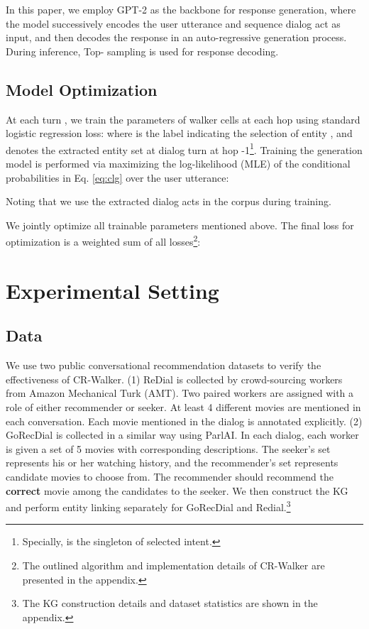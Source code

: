 \documentclass[11pt]{article}
\begin{document}
In this paper, we employ GPT-2 \cite{radford2019language} as the backbone for response generation, where the model successively encodes the user utterance   and sequence dialog act  as input, and then decodes the response  in an auto-regressive generation process. During inference, Top- sampling \cite{holtzman2020curious} is used for response decoding.

\subsection{Model Optimization}

At each turn , we train the parameters of walker cells  at each hop  using standard logistic regression loss:
 where  is the label indicating the selection of entity , and  denotes the extracted entity set at dialog turn  at hop -1\footnote{Specially,  is the singleton of selected intent.}. Training the generation model is performed via maximizing the log-likelihood (MLE) of the conditional probabilities in Eq. \ref{eq:clg} over the user utterance:

Noting that we use the extracted dialog acts in the corpus during training.

We jointly optimize all trainable parameters mentioned above. The final loss for optimization  is a weighted sum of all losses\footnote{The outlined algorithm and implementation details of CR-Walker are presented in the appendix.}:


\section{Experimental Setting}
\subsection{Data}

We use two public conversational recommendation datasets to verify the effectiveness of CR-Walker. (1) ReDial \cite{li2018towards} is collected by crowd-sourcing workers from Amazon Mechanical Turk (AMT). Two paired workers are assigned with a role of either recommender or seeker. At least 4 different movies are mentioned in each conversation. Each movie mentioned in the dialog is annotated explicitly. (2) GoRecDial \cite{kang2019recommendation} is collected in a similar way using ParlAI. In each dialog, each worker is given a set of 5 movies with corresponding descriptions. The seeker's set represents his or her watching history, and the recommender's set represents candidate movies to choose from. The recommender should recommend the \textbf{correct} movie among the candidates to the seeker. We then construct the KG and perform entity linking separately for GoRecDial and Redial.\footnote{The KG construction details and dataset statistics are shown in the appendix.} 
\end{document}
